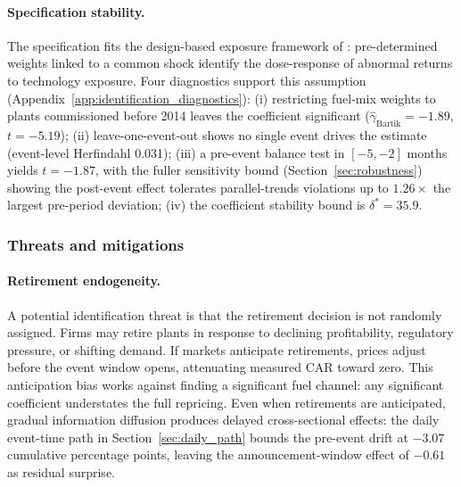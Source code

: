 \documentclass[12pt,a4paper]{article}
\begin{document}
\paragraph{Specification stability.}
The specification fits the design-based exposure framework of \citet{BorusyakHullJaravel2022}: pre-determined weights linked to a common shock identify the dose-response of abnormal returns to technology exposure. Four diagnostics support this assumption (Appendix~\ref{app:identification_diagnostics}): (i) restricting fuel-mix weights to plants commissioned before 2014 leaves the coefficient significant ($\hat\gamma_{\mathrm{Bartik}} = -1.89$, $t = -5.19$); (ii) leave-one-event-out shows no single event drives the estimate (event-level Herfindahl 0.031); (iii) a pre-event balance test in $[-5, -2]$ months yields $t = -1.87$, with the fuller \citet{RambachanRoth2023} sensitivity bound (Section~\ref{sec:robustness}) showing the post-event effect tolerates parallel-trends violations up to $1.26\times$ the largest pre-period deviation; (iv) the \citet{Oster2019} coefficient stability bound is $\delta^* = 35.9$.

\subsubsection*{Threats and mitigations}

\paragraph{Retirement endogeneity.}
A potential identification threat is that the retirement decision is not randomly assigned. Firms may retire plants in response to declining profitability, regulatory pressure, or shifting demand. If markets anticipate retirements, prices adjust before the event window opens, attenuating measured CAR toward zero. This anticipation bias works against finding a significant fuel channel: any significant coefficient understates the full repricing. Even when retirements are anticipated, gradual information diffusion \citep{HongStein1999, CohenFrazzini2008} produces delayed cross-sectional effects: the daily event-time path in Section~\ref{sec:daily_path} bounds the pre-event drift at $-3.07$ cumulative percentage points, leaving the announcement-window effect of $-0.61$ as residual surprise.
\end{document}
